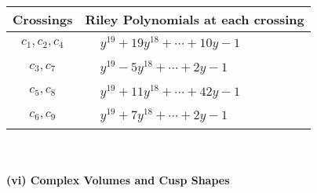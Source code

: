 \documentclass[1p]{elsarticle_modified}
\theoremstyle{definition}
\begin{document}
\begin{tabular}{m{50pt}|m{274pt}}
Crossings & \hspace{64pt}Riley Polynomials at each crossing \\
\hline $$\begin{aligned}c_{1},c_{2},c_{4}\end{aligned}$$&$\begin{aligned}
&y^{19}+19 y^{18}+\cdots+10 y-1
\end{aligned}$\\
\hline $$\begin{aligned}c_{3},c_{7}\end{aligned}$$&$\begin{aligned}
&y^{19}-5 y^{18}+\cdots+2 y-1
\end{aligned}$\\
\hline $$\begin{aligned}c_{5},c_{8}\end{aligned}$$&$\begin{aligned}
&y^{19}+11 y^{18}+\cdots+42 y-1
\end{aligned}$\\
\hline $$\begin{aligned}c_{6},c_{9}\end{aligned}$$&$\begin{aligned}
&y^{19}+7 y^{18}+\cdots+2 y-1
\end{aligned}$\\
\hline
\end{tabular}\\~\\
\newpage\flushleft \textbf{(vi) Complex Volumes and Cusp Shapes}
\end{document}

